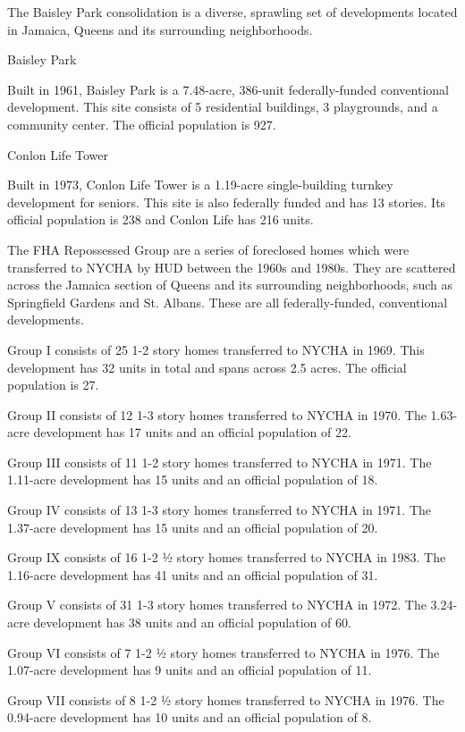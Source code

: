 
The Baisley Park consolidation is a diverse, sprawling set of developments located in Jamaica, Queens and its surrounding neighborhoods. 

Baisley Park 

Built in 1961, Baisley Park is a 7.48-acre, 386-unit federally-funded conventional development. This site consists of 5 residential buildings, 3 playgrounds, and a community center. The official population is 927. 

Conlon Life Tower 

Built in 1973, Conlon Life Tower is a 1.19-acre single-building turnkey development for seniors. This site is also federally funded and has 13 stories. Its official population is 238 and Conlon Life has 216 units. 

The FHA Repossessed Group are a series of foreclosed homes which were transferred to NYCHA by HUD between the 1960s and 1980s. They are scattered across the Jamaica section of Queens and its surrounding neighborhoods, such as Springfield Gardens and St. Albans. These are all federally-funded, conventional developments. 

Group I consists of 25 1-2 story homes transferred to NYCHA in 1969. This development has 32 units in total and spans across 2.5 acres. The official population is 27. 

Group II consists of 12 1-3 story homes transferred to NYCHA in 1970. The 1.63-acre development has 17 units and an official population of 22. 

Group III consists of 11 1-2 story homes transferred to NYCHA in 1971. The 1.11-acre development has 15 units and an official population of 18. 

Group IV consists of 13 1-3 story homes transferred to NYCHA in 1971. The 1.37-acre development has 15 units and an official population of 20. 

Group IX consists of 16 1-2 ½ story homes transferred to NYCHA in 1983. The 1.16-acre development has 41 units and an official population of 31. 

Group V consists of 31 1-3 story homes transferred to NYCHA in 1972. The 3.24-acre development has 38 units and an official population of 60. 

Group VI consists of 7 1-2 ½ story homes transferred to NYCHA in 1976. The 1.07-acre development has 9 units and an official population of 11. 

Group VII consists of 8 1-2 ½ story homes transferred to NYCHA in 1976. The 0.94-acre development has 10 units and an official population of 8.

